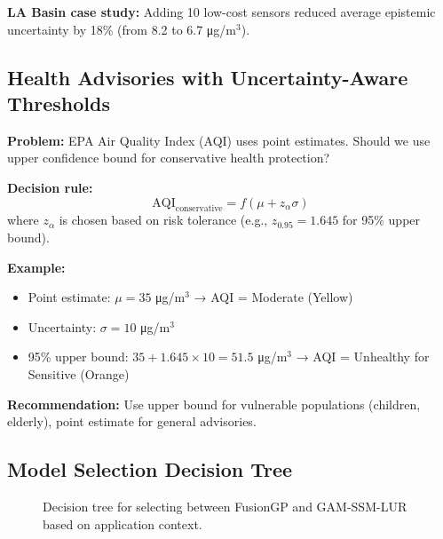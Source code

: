\documentclass[11pt,letterpaper]{article}
\begin{document}
\textbf{LA Basin case study:} Adding 10 low-cost sensors reduced average epistemic uncertainty by 18\% (from 8.2 to 6.7 μg/m$^3$).

\subsection{Health Advisories with Uncertainty-Aware Thresholds}

\textbf{Problem:} EPA Air Quality Index (AQI) uses point estimates. Should we use upper confidence bound for conservative health protection?

\textbf{Decision rule:}
\begin{equation}
\text{AQI}_{\text{conservative}} = f(\mu + z_\alpha \sigma)
\label{eq:conservative_aqi}
\end{equation}
where $z_\alpha$ is chosen based on risk tolerance (e.g., $z_{0.95} = 1.645$ for 95\% upper bound).

\textbf{Example:}
\begin{itemize}
    \item Point estimate: $\mu = 35$ μg/m$^3$ → AQI = Moderate (Yellow)
    \item Uncertainty: $\sigma = 10$ μg/m$^3$
    \item 95\% upper bound: $35 + 1.645 \times 10 = 51.5$ μg/m$^3$ → AQI = Unhealthy for Sensitive (Orange)
\end{itemize}

\textbf{Recommendation:} Use upper bound for vulnerable populations (children, elderly), point estimate for general advisories.

\subsection{Model Selection Decision Tree}

\begin{figure}[h]
\centering
\caption{Decision tree for selecting between FusionGP and GAM-SSM-LUR based on application context.}
\label{fig:decision_tree}
\end{figure}
\end{document}
